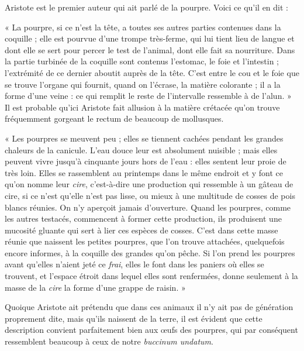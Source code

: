 \documentclass[a4paper, 11pt, oneside, polutonikogreek, french]{article}
\begin{document}
Aristote est le premier auteur qui ait parlé de la pourpre. Voici ce qu'il en dit :

« La pourpre, si ce n'est la tête, a toutes ses autres parties contenues dans la coquille ; elle est pourvue d'une trompe très-ferme, qui lui tient lieu de langue et dont elle se sert pour percer le test de l'animal, dont elle fait sa nourriture. Dans la partie turbinée de la coquille sont contenus l'estomac, le foie et l'intestin ; l'extrémité de ce dernier aboutit auprès de la tête. C'est entre le cou et le foie que se trouve l'organe qui fournit, quand on l'écrase, la matière colorante ; il a la forme d'une veine : ce qui remplit le reste de l'intervalle ressemble à de l'alun. » Il est probable qu'ici Aristote fait allusion à la matière crétacée qu'on trouve fréquemment gorgeant le rectum de beaucoup de mollusques.

« Les pourpres se meuvent peu ; elles se tiennent cachées pendant les grandes chaleurs de la canicule. L'eau douce leur est absolument nuisible ; mais elles peuvent vivre jusqu'à cinquante jours hors de l'eau : elles sentent leur proie de très loin. Elles se rassemblent au printemps dans le même endroit et y font ce qu'on nomme leur \emph{cire}, c'est-à-dire une production qui ressemble à un gâteau de cire, si ce n'est qu'elle n'est pas lisse, ou mieux à une multitude de cosses de pois blancs réunies. On n'y aperçoit jamais d'ouverture. Quand les pourpres, comme les autres testacés, commencent à former cette production, ils produisent une mucosité gluante qui sert à lier ces espèces de cosses. C'est dans cette masse réunie que naissent les petites pourpres, que l'on trouve attachées, quelquefois encore informes, à la coquille des grandes qu'on pêche. Si l'on prend les pourpres avant qu'elles n'aient jeté ce \emph{frai}, elles le font dans les paniers où elles se trouvent, et l'espace étroit dans lequel elles sont renfermées, donne seulement à la masse de la \emph{cire} la forme d'une grappe de raisin. »

Quoique Aristote ait prétendu que dans ces animaux il n'y ait pas de génération proprement dite, mais qu'ils naissent de la terre, il est évident que cette description convient parfaitement bien aux œufs des pourpres, qui par conséquent ressemblent beaucoup à ceux de notre \emph{buccinum undatum}.
\end{document}
